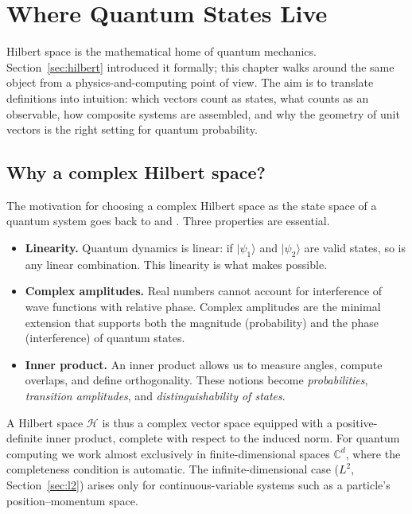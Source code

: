 \chapter{Where Quantum States Live}


Hilbert space is the mathematical home of quantum mechanics. Section~\ref{sec:hilbert} introduced it formally; this chapter walks around the same object from a physics-and-computing point of view. The aim is to translate definitions into intuition: which vectors count as states, what counts as an observable, how composite systems are assembled, and why the geometry of unit vectors is the right setting for quantum probability.

\section{Why a complex Hilbert space?}

The motivation for choosing a complex Hilbert space as the state space of a quantum system goes back to \citet{dirac_principles_1958} and \citet{schrodinger_undulatory_1926}. Three properties are essential.

\begin{itemize}
  \item \textbf{Linearity.} Quantum dynamics is linear: if $|\psi_1\rangle$ and $|\psi_2\rangle$ are valid states, so is any linear combination. This linearity is what makes  possible.
  \item \textbf{Complex amplitudes.} Real numbers cannot account for interference of wave functions with relative phase. Complex amplitudes are the minimal extension that supports both the magnitude (probability) and the phase (interference) of quantum states.
  \item \textbf{Inner product.} An inner product allows us to measure angles, compute overlaps, and define orthogonality. These notions become \emph{probabilities}, \emph{transition amplitudes}, and \emph{distinguishability of states}.
\end{itemize}

A Hilbert space $\mathcal{H}$ is thus a complex vector space equipped with a positive-definite inner product, complete with respect to the induced norm. For quantum computing we work almost exclusively in finite-dimensional spaces $\mathbb{C}^d$, where the completeness condition is automatic. The infinite-dimensional case ($L^2$, Section~\ref{sec:l2}) arises only for continuous-variable systems such as a particle's position--momentum space.

